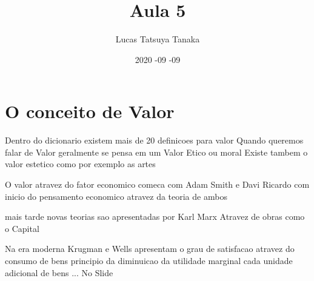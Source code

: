 \documentclass{article} %
\title{Aula 5} %
\date{2020 -09 -09{}}
\author{Lucas Tatsuya Tanaka}
\begin{document}
  \maketitle

  \section{O conceito de Valor}
    Dentro do dicionario existem mais de 20 definicoes para valor   
    Quando queremos falar de Valor geralmente se pensa em um Valor Etico ou moral 
    Existe tambem o valor estetico como por exemplo as artes 

    O valor atravez do fator economico comeca com Adam Smith e Davi Ricardo com inicio do pensamento 
    economico atravez da teoria de ambos 

    mais tarde novas teorias sao apresentadas por Karl Marx Atravez de obras como o Capital 

    Na era moderna Krugman e Wells apresentam o grau de satisfacao atravez do consumo de bens 
    principio da diminuicao da utilidade marginal cada unidade adicional de bens ... No Slide 

    
\end{document}
